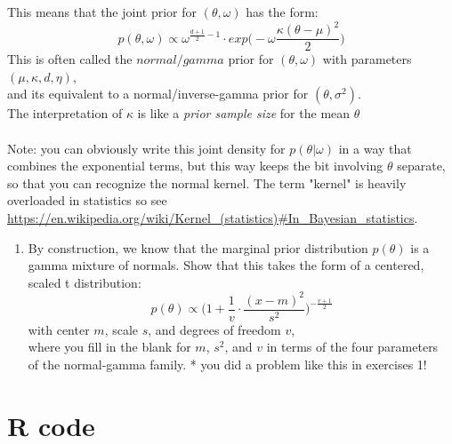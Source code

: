 \documentclass{homework}
\begin{document}
This means that the joint prior for $(\theta, \omega)$ has the form:
$$ p(\theta, \omega) \propto \omega^{\frac{d+1}{2} - 1 } \cdot exp\big( -\omega \frac{\kappa(\theta - \mu)^2}{2} \big)$$
This is often called the $normal/gamma$ prior for $(\theta, \omega)$ with parameters $(\mu, \kappa, d, \eta)$, \\ and its equivalent to a normal/inverse-gamma prior for $(\theta, \sigma^2)$. \\ The interpretation of $\kappa$ is like a \textit{prior sample size} for the mean $\theta$ \\ \\Note: you can obviously write this joint density for $p(\theta | \omega)$ in a way that combines the exponential terms, but this way keeps the bit involving $\theta$ separate, so that you can recognize the normal kernel.  The term "kernel" is heavily overloaded in statistics so see \url{https://en.wikipedia.org/wiki/Kernel_(statistics)#In_Bayesian_statistics}.

\begin{enumerate}[label=(\Alph*)]
\item By construction, we know that the marginal prior distribution $p(\theta)$ is a gamma mixture of normals. Show that this takes the form of a centered, scaled t distribution:$$p(\theta) \propto \big( 1 + \frac{1}{v} \cdot \frac{(x-m)^2}{s^2}\big)^{-\frac{v+1}{2}}$$
with center $m$, scale $s$, and degrees of freedom $v$, \\ where you fill in the blank for $m$, $s^2$, and $v$ in terms of the four parameters\\ of the normal-gamma family. * you did a problem like this in exercises 1!
\end{enumerate}

\clearpage

\appendix
\chapter{R code}
\label{chap:code}
\end{document}

